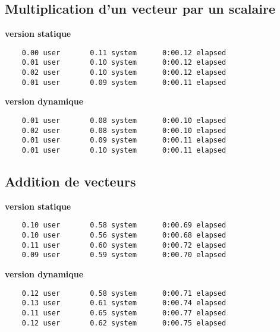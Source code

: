 \documentclass{rapport}
\begin{document}
  \subsection{Multiplication d'un vecteur par un scalaire}
  \textbf{version statique}
  \begin{lstlisting}
    0.00 user       0.11 system      0:00.12 elapsed 
    0.01 user       0.10 system      0:00.12 elapsed
    0.02 user       0.10 system      0:00.12 elapsed
    0.01 user       0.09 system      0:00.11 elapsed
  \end{lstlisting}


  \textbf{version dynamique}
  \begin{lstlisting}
    0.01 user       0.08 system      0:00.10 elapsed 
    0.02 user       0.08 system      0:00.10 elapsed
    0.01 user       0.09 system      0:00.11 elapsed 
    0.01 user       0.10 system      0:00.11 elapsed
  \end{lstlisting}

  \subsection{Addition de vecteurs}
  \textbf{version statique}
  \begin{lstlisting}
    0.10 user       0.58 system      0:00.69 elapsed
    0.10 user       0.56 system      0:00.68 elapsed
    0.11 user       0.60 system      0:00.72 elapsed
    0.09 user       0.59 system      0:00.70 elapsed
  \end{lstlisting}


  \textbf{version dynamique}
  \begin{lstlisting}
    0.12 user       0.58 system      0:00.71 elapsed
    0.13 user       0.61 system      0:00.74 elapsed
    0.11 user       0.65 system      0:00.77 elapsed
    0.12 user       0.62 system      0:00.75 elapsed
  \end{lstlisting}

  
\end{document}
